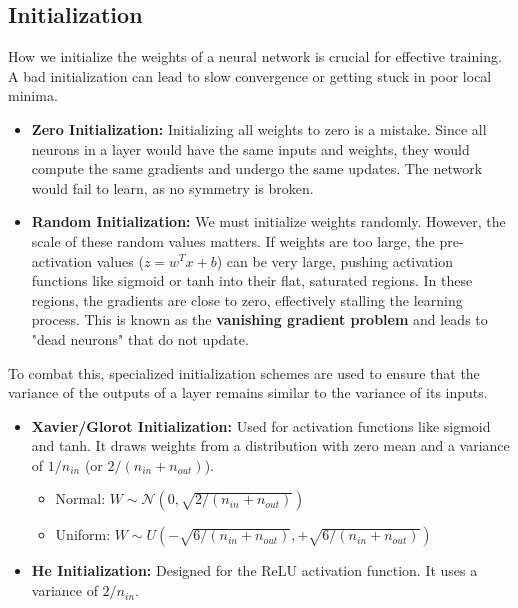 \documentclass{article}
\begin{document}
\begin{multicols}{2}
	\subsection{Initialization}
	How we initialize the weights of a neural network is crucial for effective training. A bad initialization can lead to slow convergence or getting stuck in poor local minima.
	\begin{itemize}
		\item \textbf{Zero Initialization:} Initializing all weights to zero is a mistake. Since all neurons in a layer would have the same inputs and weights, they would compute the same gradients and undergo the same updates. The network would fail to learn, as no symmetry is broken.
		\item \textbf{Random Initialization:} We must initialize weights randomly. However, the scale of these random values matters. If weights are too large, the pre-activation values ($z = w^T x + b$) can be very large, pushing activation functions like sigmoid or tanh into their flat, saturated regions. In these regions, the gradients are close to zero, effectively stalling the learning process. This is known as the \textbf{vanishing gradient problem} and leads to "dead neurons" that do not update.
	\end{itemize}

	To combat this, specialized initialization schemes are used to ensure that the variance of the outputs of a layer remains similar to the variance of its inputs.
	\begin{itemize}
		\item \textbf{Xavier/Glorot Initialization:} Used for activation functions like sigmoid and tanh. It draws weights from a distribution with zero mean and a variance of $1/n_{in}$ (or $2/(n_{in} + n_{out})$).
		      \begin{itemize}
			      \item Normal: $W \sim \mathcal{N}(0, \sqrt{2/(n_{in} + n_{out})})$
			      \item Uniform: $W \sim U(-\sqrt{6/(n_{in} + n_{out})}, +\sqrt{6/(n_{in} + n_{out})})$
		      \end{itemize}
		\item \textbf{He Initialization:} Designed for the ReLU activation function. It uses a variance of $2/n_{in}$.
	\end{itemize}


\end{multicols}
\end{document}
